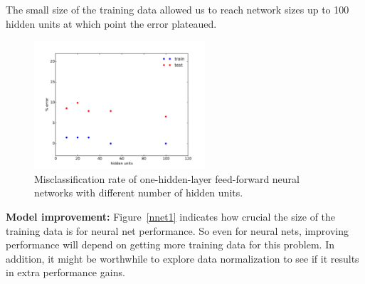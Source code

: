 \documentclass[10pt,letterpaper]{article}
\begin{document}
The small size of the training data allowed us to reach network sizes up to 100 hidden units at which point the error plateaued.
\begin{figure}[!tbp]
	\begin{center}
	\includegraphics[width=2.5in]{../results/ionosphere/nnet/error_vs_hidden_units.pdf}
	\end{center}
	\caption{Misclassification rate of one-hidden-layer feed-forward neural networks with different number of hidden units. \label{nnetion1}}
\end{figure}

{\bf Model improvement: } Figure~\ref{nnet1} indicates how crucial the size of the training data is for neural net performance. So even for neural nets, improving performance will depend on getting more training data for this problem. In addition, it might be worthwhile to explore data normalization to see if it results in extra performance gains. 
\end{document}
